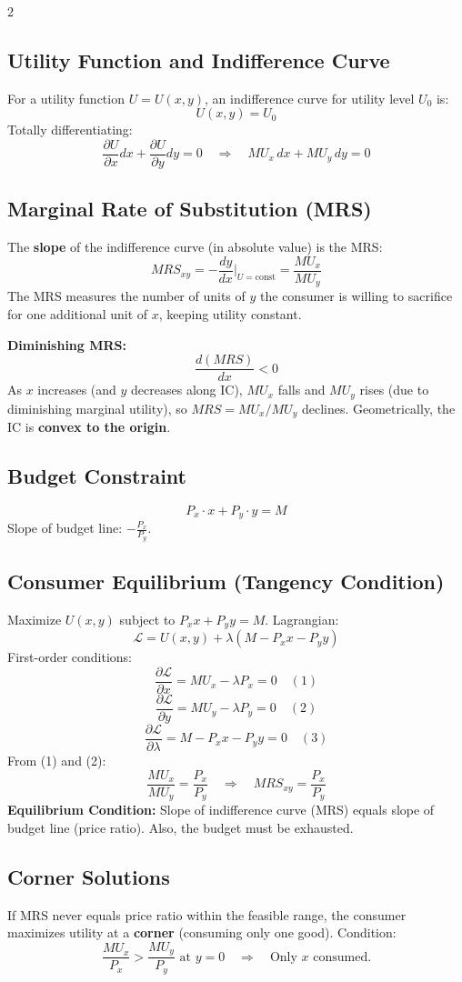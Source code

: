 \documentclass[10pt,a4paper]{article}
\begin{document}
\begin{multicols}{2}
\subsection*{Utility Function and Indifference Curve}
For a utility function $U = U(x, y)$, an indifference curve for utility level $U_0$ is:
\[
U(x, y) = U_0
\]
Totally differentiating:
\[
\frac{\partial U}{\partial x} dx + \frac{\partial U}{\partial y} dy = 0 \quad \Rightarrow \quad MU_x \, dx + MU_y \, dy = 0
\]

\subsection*{Marginal Rate of Substitution (MRS)}
The \textbf{slope} of the indifference curve (in absolute value) is the MRS:
\[
MRS_{xy} = -\frac{dy}{dx}\bigg|_{U=\text{const}} = \frac{MU_x}{MU_y}
\]
The MRS measures the number of units of $y$ the consumer is willing to sacrifice for one additional unit of $x$, keeping utility constant.

\textbf{Diminishing MRS:}
\[
\frac{d(MRS)}{dx} < 0
\]
As $x$ increases (and $y$ decreases along IC), $MU_x$ falls and $MU_y$ rises (due to diminishing marginal utility), so $MRS = MU_x/MU_y$ declines. Geometrically, the IC is \textbf{convex to the origin}.

\subsection*{Budget Constraint}
\[
P_x \cdot x + P_y \cdot y = M
\]
Slope of budget line: $-\frac{P_x}{P_y}$.

\subsection*{Consumer Equilibrium (Tangency Condition)}
Maximize $U(x,y)$ subject to $P_x x + P_y y = M$. Lagrangian:
\[
\mathcal{L} = U(x,y) + \lambda (M - P_x x - P_y y)
\]
First-order conditions:
\[
\frac{\partial \mathcal{L}}{\partial x} = MU_x - \lambda P_x = 0 \quad (1)
\]
\[
\frac{\partial \mathcal{L}}{\partial y} = MU_y - \lambda P_y = 0 \quad (2)
\]
\[
\frac{\partial \mathcal{L}}{\partial \lambda} = M - P_x x - P_y y = 0 \quad (3)
\]
From (1) and (2):
\[
\frac{MU_x}{MU_y} = \frac{P_x}{P_y} \quad \Rightarrow \quad MRS_{xy} = \frac{P_x}{P_y}
\]
\textbf{Equilibrium Condition:} Slope of indifference curve (MRS) equals slope of budget line (price ratio). Also, the budget must be exhausted.

\subsection*{Corner Solutions}
If MRS never equals price ratio within the feasible range, the consumer maximizes utility at a \textbf{corner} (consuming only one good). Condition:
\[
\frac{MU_x}{P_x} > \frac{MU_y}{P_y} \text{ at } y=0 \quad \Rightarrow \quad \text{Only } x \text{ consumed.}
\]


\end{multicols}
\end{document}
